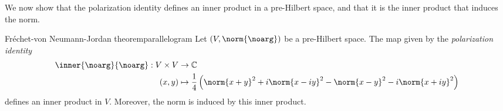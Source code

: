 We now show that the polarization identity defines an inner product in a pre-Hilbert space, and that it is the inner product that induces the norm.
\begin{theorem}{Fréchet-von Neumann-Jordan theorem}{parallelogram}
    Let \((V, \norm{\noarg})\) be a pre-Hilbert space. The map given by the \emph{polarization identity}
    \begin{align*}
        \inner{\noarg}{\noarg} : V \times V &\to \mathbb{C}\\
                                      (x,y) &\mapsto \frac14\left(\norm{x + y}^2 + i \norm{x - iy}^2 - \norm{x - y}^2 - i \norm{x + iy}^2\right)
    \end{align*}
    defines an inner product in \(V\). Moreover, the norm is induced by this inner product.
\end{theorem}
